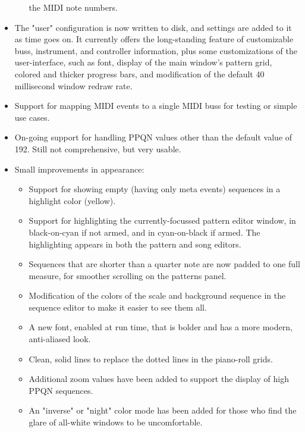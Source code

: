 \documentclass[
 11pt,
 twoside,
 a4paper,
 headinclude,
 footinclude,
 final                                 %
]{article}
\begin{document}
\begin{itemize}
\begin{itemize}
            the MIDI note numbers.  
      \end{itemize}
      \item The "user" configuration is now written to disk, and 
         settings are added to it as time goes on.  It currently offers the
         long-standing feature of customizable buss, instrument, and controller
         information, plus some customizations of the user-interface, such as
         font, display of the main window's pattern grid, colored and thicker
         progress bars, and modification of the default 40 millisecond window
         redraw rate.
      \item Support for mapping MIDI events to a single MIDI buss for testing
         or simple use cases.
      \item On-going support for handling PPQN values other than the
         default value of 192.  Still not comprehensive, but very usable.
      \item Small improvements in appearance:
      \begin{itemize}
         \item Support for showing empty (having only meta
            events) sequences in a highlight color (yellow).
         \item Support for highlighting the currently-focussed pattern editor
            window, in black-on-cyan if not armed, and in cyan-on-black if
            armed.  The highlighting appears in both the pattern and song
            editors.
         \item Sequences that are shorter than a quarter note are now padded to
            one full measure, for smoother scrolling on the patterns panel.
         \item Modification of the colors of the scale and background sequence
            in the sequence editor to make it easier to see them all.
         \item A new font, enabled at run time, that is bolder and has a
            more modern, anti-aliased look.
         \item Clean, solid lines to replace the dotted lines in the piano-roll
            grids.
         \item Additional zoom values have been added to support the display
            of high PPQN sequences.
         \item An "inverse" or "night" color mode has been added for those
            who find the glare of all-white windows to be uncomfortable.
      \end{itemize}

\end{itemize}
\end{document}
